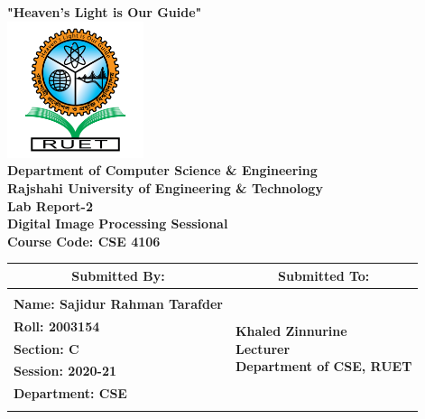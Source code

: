 \documentclass[12pt,a4paper]{report}
\begin{document}
\begin{titlepage}
    \thispagestyle{empty}
    \centering
    \vspace*{0.5cm}
    {\large \textbf{"Heaven's Light is Our Guide"}}\\[0.3cm]
    \includegraphics[width=4cm]{../Lab5/ruet_logo.png}\\[0.4cm]
    {\Large \textbf{Department of Computer Science \& Engineering}}\\[0.3cm]
    {\large \textbf{Rajshahi University of Engineering \& Technology}}\\[0.8cm]
    {\LARGE \textbf{Lab Report-2}}\\[0.5cm]
    {\LARGE \textbf{Digital Image Processing Sessional}}\\[0.5cm]
    {\LARGE \textbf{Course Code: CSE 4106}}\\[0.3cm]

    \vspace{0.8cm}
    \begin{table}[h!]
    \centering
    \setlength{\arrayrulewidth}{1.5pt}
    \renewcommand{\arraystretch}{1.5}
    \begin{tabular}{|p{8.5cm}|p{6.5cm}|}
        \hline
        \multicolumn{1}{|c|}{\large \textbf{Submitted By:}} & \multicolumn{1}{c|}{\large \textbf{Submitted To:}} \\
        \hline
        & \\
        \large \textbf{Name: Sajidur Rahman Tarafder} & \multirow{5}{*}{\parbox{6.5cm}{\centering 
        \large \textbf{Khaled Zinnurine}\\
        \vspace{0.2cm}
        \large \textbf{Lecturer}\\
        \vspace{0.2cm}
        \large \textbf{Department of CSE, RUET}}}\\
        \large \textbf{Roll: 2003154} & \\
        \large \textbf{Section: C} & \\
        \large \textbf{Session: 2020-21} & \\
        \large \textbf{Department: CSE} & \\
        & \\
        \hline
    \end{tabular}
    \end{table}
\end{titlepage}
\end{document}
